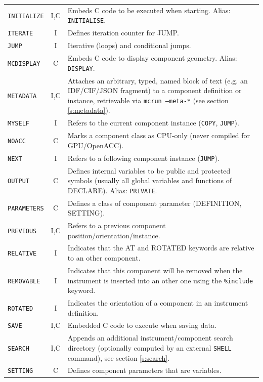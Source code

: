 \begin{table}
\begin{center}
{\begin{tabular}{|l|c|p{}|}
      \texttt{INITIALIZE} & I,C & Embeds C code to be executed when starting. Alias: \texttt{INITIALISE}. \\
      \texttt{ITERATE} & I & Defines iteration counter for JUMP. \\
      \texttt{JUMP} & I & Iterative (loops) and conditional jumps. \\
      \texttt{MCDISPLAY} & C & Embeds C code to display component geometry. Alias: \texttt{DISPLAY}. \\
      \texttt{METADATA} & I,C & Attaches an arbitrary, typed, named block of text (e.g. an IDF/CIF/JSON fragment) to a component definition or instance, retrievable via \texttt{mcrun --meta-*} (see section \ref{s:metadata}). \\
      \texttt{MYSELF} & I & Refers to the current component instance (\texttt{COPY}, \texttt{JUMP}). \\
      \texttt{NOACC} & C & Marks a component class as CPU-only (never compiled for GPU/OpenACC). \\
      \texttt{NEXT} & I & Refers to a following component instance (\texttt{JUMP}). \\
      \texttt{OUTPUT} & C & Defines internal variables to be public and protected symbols (usually all global variables and functions of DECLARE). Alias: \texttt{PRIVATE}.\\
      \texttt{PARAMETERS} & C & Defines a class of component parameter (DEFINITION, SETTING). \\
      \texttt{PREVIOUS} & I,C & Refers to a previous component position/orientation/instance.\\
      \texttt{RELATIVE} & I & Indicates that the AT and ROTATED keywords are relative to an other component. \\
      \texttt{REMOVABLE} & I & Indicates that this component will be removed when the instrument is inserted into an other one using the \texttt{\%include} keyword. \\
      \texttt{ROTATED} & I & Indicates the orientation of a component in an instrument definition. \\
      \texttt{SAVE} & I,C & Embedded C code to execute when saving data. \\
      \texttt{SEARCH} & I,C & Appends an additional instrument/component search directory (optionally computed by an external \texttt{SHELL} command), see section \ref{s:search}. \\
      \texttt{SETTING} & C & Defines component parameters that are
      variables. \\

\end{tabular}}
\end{center}
\end{table}
